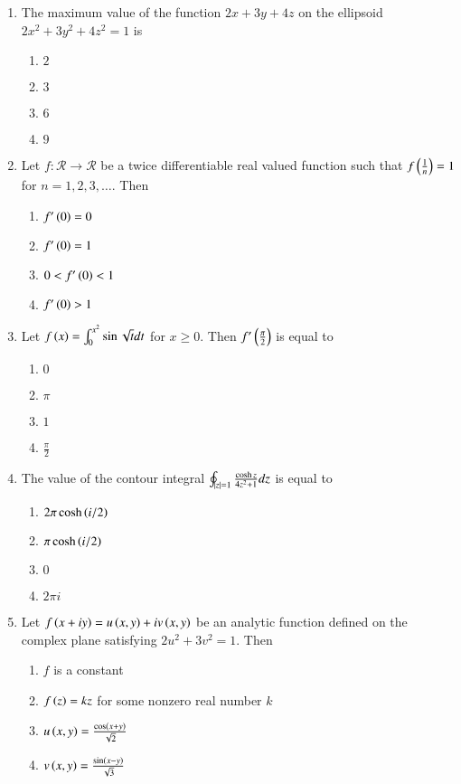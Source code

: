 \documentclass[journal]{IEEEtran}
\begin{document}
\begin{enumerate}
    \item The maximum value of the function $2x +3y +4z$ on the ellipsoid $2x^2 +3y^2+ 4z^2 = 1$ is
        \begin{enumerate}
            \item $2$
            \item $3$
            \item $6$
            \item $9$
        \end{enumerate}

    \item Let $f : \mathcal{R} \to \mathcal{R}$ be a twice differentiable real valued function such that $f\left(\frac{1}{n}\right) = 1$ for $n = 1,2,3,\ldots$. Then
        \begin{enumerate}
            \item $f^{\prime}\left(0\right) = 0$
            \item $f^{\prime}\left(0\right) = 1$
            \item $0 < f^{\prime}\left(0\right) < 1$
            \item $f^{\prime}\left(0\right) > 1$
        \end{enumerate}

    \item Let $f\left(x\right) = \int_{0}^{x^2} \sin \sqrt{t} dt$ for $x\geq0$. Then $f^{\prime}\left(\frac{\pi}{2}\right)$ is equal to
        \begin{enumerate}
            \item $0$
            \item $\pi$
            \item $1$
            \item $\frac{\pi}{2}$
        \end{enumerate}

    \item The value of the contour integral $\oint_{\left\vert z\right\vert=1} \frac{\cosh z}{4z^2+1} dz$ is equal to
        \begin{enumerate}
            \item $2 \pi \cosh \left(i/2\right)$
            \item $\pi \cosh \left(i/2\right)$
            \item $0$
            \item $2 \pi i$
        \end{enumerate}

    \item Let $f\left(x + iy\right) = u\left(x,y\right) + iv\left(x,y\right)$ be an analytic function defined on the complex plane satisfying $2u^2 + 3v^2=1$. Then
        \begin{enumerate}
            \item $f$ is a constant
            \item $f\left(z\right) = kz$ for some nonzero real number $k$
            \item $u\left(x,y\right) = \frac{\cos \left(x+y\right)}{\sqrt{2}}$
            \item $v\left(x,y\right) = \frac{\sin \left(x-y\right)}{\sqrt{3}}$
        \end{enumerate}


\end{enumerate}
\end{document}

